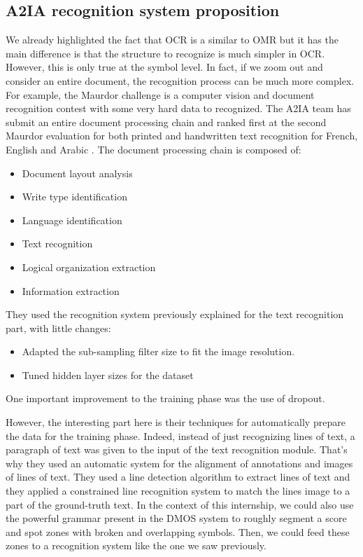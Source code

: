 \documentclass[11pt]{sdm}
\begin{document}
\subsection{A2IA recognition system proposition}

We already highlighted the fact that OCR is a similar to OMR but it has the main difference is that the structure to recognize is much simpler in OCR.
However, this is only true at the symbol level.
In fact, if we zoom out and consider an entire document, the recognition process can be much more complex.
For example, the Maurdor challenge is a computer vision and document recognition contest with some very hard data to recognized.
The A2IA team has submit an entire document processing chain and ranked first at the second Maurdor evaluation for both printed and handwritten text recognition for French, English and Arabic \cite{moysset_a2ia_2014}.
The document processing chain is composed of:
\begin{itemize}
  \item Document layout analysis
  \item Write type identification
  \item Language identification
  \item Text recognition
  \item Logical organization extraction
  \item Information extraction
\end{itemize}
They used the recognition system previously explained for the text recognition part, with little changes:
\begin{itemize}
  \item Adapted the sub-sampling filter size to fit the image resolution.
  \item Tuned hidden layer sizes for the dataset
\end{itemize}
One important improvement to the training phase was the use of dropout.

However, the interesting part here is their techniques for automatically prepare the data for the training phase.
Indeed, instead of just recognizing lines of text, a paragraph of text was given to the input of the text recognition module.
That's why they used an automatic system for the alignment of annotations and images of lines of text.
They used a line detection algorithm to extract lines of text and they applied a constrained line recognition system to match the lines image to a part of the ground-truth text.
In the context of this internship, we could also use the powerful grammar present in the DMOS system to roughly segment a score and spot zones with broken and overlapping symbols.
Then, we could feed these zones to a recognition system like the one we saw previously.
\end{document}
